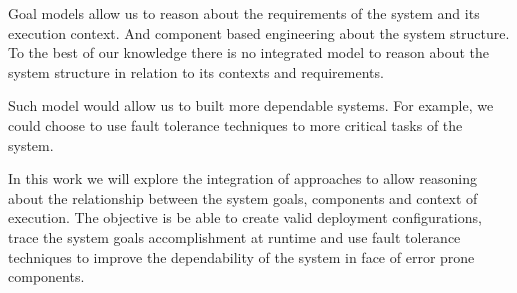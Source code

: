 
 Goal models allow us to reason about the requirements of the system and its execution context. And component based engineering about the system structure. To the best of our knowledge there is no integrated model to reason about the system structure in relation to its contexts and requirements.

Such model would allow us to built more dependable systems. For example, we could choose to use fault tolerance techniques to more critical tasks of the system.

 In this work we will explore the integration of approaches to allow reasoning about the relationship between the system goals, components and context of execution. The objective is be able to create valid deployment configurations, trace the system goals accomplishment at runtime and use fault tolerance techniques to improve the dependability of the system in face of error prone components.
